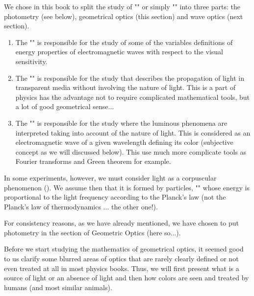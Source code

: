 	We chose in this book to split the study of "" or simply "" into three parts: the photometry (see below), geometrical optics (this section) and wave optics (next section).
	\begin{enumerate}
		\item The "" is responsible for the study of some of the variables definitions of energy properties of electromagnetic waves with respect to the visual sensitivity.
		
		\item The "" is responsible for the study that describes the propagation of light in transparent media without involving the nature of light. This is a part of physics has the advantage not to require complicated mathematical tools, but a lot of good geometrical sense...
		
		\item The "" is responsible for the study where the luminous phenomena are interpreted taking into account of the nature of light. This is considered as an electromagnetic wave of a given wavelength defining its color (subjective concept as we will discussed below). This use much more complicate tools as Fourier transforms and Green theorem for example.
	\end{enumerate}
	In some experiments, however, we must consider light as a corpuscular phenomenon (). We assume then that it is formed by particles, "" whose energy is proportional to the light frequency according to the Planck's law (not the Planck's law of thermodynamics ... the other one!).
	
	For consistency reasons, as we have already mentioned, we have chosen to put photometry in the section of Geometric Optics (here so...).
	
	Before we start studying the mathematics of geometrical optics, it seemed good to us clarify some blurred areas of optics that are rarely clearly defined or not even treated at all in most physics books. Thus, we will first present what is a source of light or an absence of light and then how colors are seen and treated by humans (and most similar animals).

